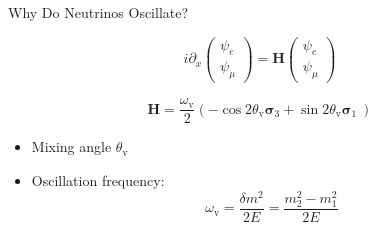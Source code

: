 \begin{frame}[fragile]{Why Do Neutrinos Oscillate?}





\begin{tcolorbox}[title=Equation of Motion, standard jigsaw, opacityback=0, coltext=white]

\begin{equation*}
i\partial_x \begin{pmatrix}
\psi_e\\
\psi_\mu
\end{pmatrix} = \mathbf{H}\begin{pmatrix}
\psi_e\\
\psi_\mu
\end{pmatrix}
\end{equation*}

\end{tcolorbox}

\pause

\begin{tcolorbox}[standard jigsaw, opacityback=0,coltext=white]
\begin{equation*}
\mathbf{H} = \frac{\omega_{\mathrm v} }{2}\left( - \cos 2\theta_{\mathrm v } \boldsymbol{\sigma}_3  + \sin 2\theta_{\mathrm{v}} \boldsymbol{\sigma}_1\ \right)
\end{equation*}


\begin{itemize}
\item  Mixing angle $\theta_{\mathrm v}$
\item  Oscillation frequency:
\begin{equation*}
\omega_{\mathrm v} = \frac{\delta m^2}{2E}=\frac{m_2^2 - m_1^2}{2E}
\end{equation*}

\end{itemize}


\end{tcolorbox}






\end{frame}



